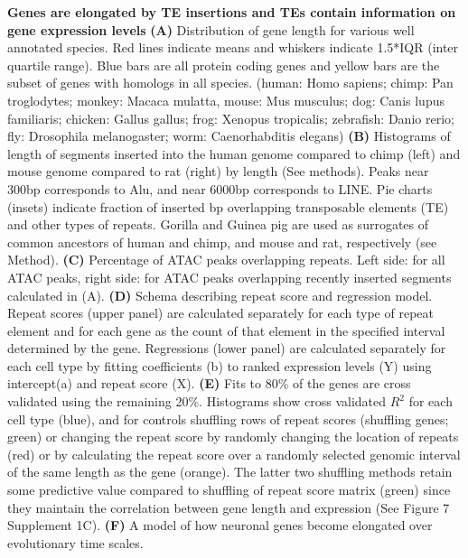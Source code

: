 \textbf{Genes are elongated by TE insertions and TEs contain information on gene expression levels}
\textbf{(A)} Distribution of gene length for various well annotated species. Red lines indicate means and whiskers indicate 1.5*IQR (inter quartile range). Blue bars are all protein coding genes and yellow bars are the subset of genes with homologs in all species. (human: Homo sapiens; chimp: Pan troglodytes; monkey: Macaca mulatta, mouse: Mus musculus; dog: Canis lupus familiaris; chicken: Gallus gallus; frog: Xenopus tropicalis; zebrafish: Danio rerio; fly: Drosophila melanogaster; worm: Caenorhabditis  elegans)
\textbf{(B)} Histograms of length of segments inserted into the human genome compared to chimp (left) and mouse genome compared to rat (right) by length (See methods). Peaks near 300bp corresponds to Alu, and near 6000bp corresponds to LINE. Pie charts (insets) indicate fraction of inserted bp overlapping transposable elements (TE) and other types of repeats. Gorilla and Guinea pig are used as surrogates of common ancestors of human and chimp, and mouse and rat, respectively (see Method). 
\textbf{(C)} Percentage of ATAC peaks overlapping repeats. Left side: for all ATAC peaks, right side: for ATAC peaks overlapping recently inserted segments calculated in (A). 
\textbf{(D)} Schema describing repeat score and regression model. Repeat scores (upper panel) are calculated separately for each type of repeat element and for each gene as the count of that element in the specified interval determined by the gene. Regressions (lower panel) are calculated separately for each cell type by fitting coefficients (b) to ranked expression levels (Y) using intercept(a) and repeat score (X). 
\textbf{(E)} Fits to 80\% of the genes are cross validated using the remaining 20\%. Histograms show cross validated $R^2$ for each cell type (blue), and for controls shuffling rows of repeat scores (shuffling genes; green) or changing the repeat score by randomly changing the location of repeats (red) or by calculating the repeat score over a randomly selected genomic interval of the same length as the gene (orange). The latter two shuffling methods retain some predictive value compared to shuffling of repeat score matrix (green) since they maintain the correlation between gene length and expression (See Figure 7 Supplement 1C).
\textbf{(F)} A model of how neuronal genes become elongated over evolutionary time scales. 
